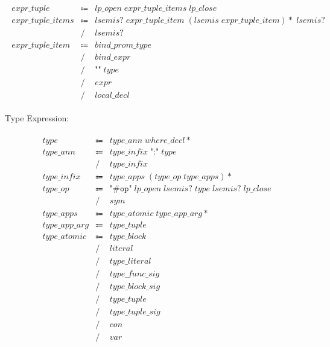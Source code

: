 \begin{align*}
    \begin{array}{rcll}
        \mathit{expr\_tuple}
        &\Coloneq &\mathit{lp\_open}\; \mathit{expr\_tuple\_items}\; \mathit{lp\_close} \\
        \mathit{expr\_tuple\_items}
        &\Coloneq &\mathit{lsemis}{?}\; \mathit{expr\_tuple\_item}\; (\mathit{lsemis}\; \mathit{expr\_tuple\_item}){*}\; \mathit{lsemis}{?} \\
        &\mathrel{/} &\mathit{lsemis}{?} \\
        \mathit{expr\_tuple\_item}
        &\Coloneq &\mathit{bind\_prom\_type} \\
        &\mathrel{/} &\mathit{bind\_expr} \\
        &\mathrel{/} &\texttt{"\^{}"}\; \mathit{type} \\
        &\mathrel{/} &\mathit{expr} \\
        &\mathrel{/} &\mathit{local\_decl}
    \end{array}
\end{align*}

Type Expression:

\begin{align*}
    \begin{array}{rcll}
        \mathit{type}
        &\Coloneq &\mathit{type\_ann}\; \mathit{where\_decl}{*} \\
        \mathit{type\_ann}
        &\Coloneq &\mathit{type\_infix}\; \texttt{":"}\; \mathit{type} \\
        &\mathrel{/} &\mathit{type\_infix} \\
        \mathit{type\_infix}
        &\Coloneq &\mathit{type\_apps}\; (\mathit{type\_op}\; \mathit{type\_apps}){*} \\
        \mathit{type\_op}
        &\Coloneq &\texttt{"\#op"}\; \mathit{lp\_open}\; \mathit{lsemis}{?}\; \mathit{type}\; \mathit{lsemis}{?}\; \mathit{lp\_close} \\
        &\mathrel{/} &\mathit{sym} \\
        \mathit{type\_apps}
        &\Coloneq &\mathit{type\_atomic}\; \mathit{type\_app\_arg}{*} \\
        \mathit{type\_app\_arg}
        &\Coloneq &\mathit{type\_tuple} \\
        \mathit{type\_atomic}
        &\Coloneq &\mathit{type\_block} \\
        &\mathrel{/} &\mathit{literal} \\
        &\mathrel{/} &\mathit{type\_literal} \\
        &\mathrel{/} &\mathit{type\_func\_sig} \\
        &\mathrel{/} &\mathit{type\_block\_sig} \\
        &\mathrel{/} &\mathit{type\_tuple} \\
        &\mathrel{/} &\mathit{type\_tuple\_sig} \\
        &\mathrel{/} &\mathit{con} \\
        &\mathrel{/} &\mathit{var}
    \end{array}
\end{align*}

